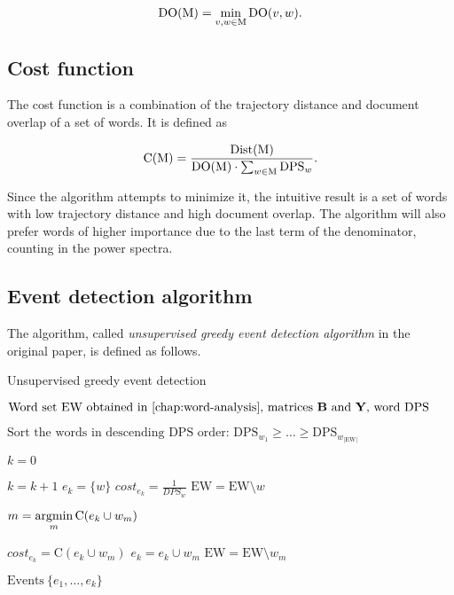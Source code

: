 \begin{equation} \label{eq:document-overlap}
	\text{DO}( \text{M} ) = \min_{v, w \in \text{M}} \text{DO}( v, w ).
\end{equation}

\subsection{Cost function}
The cost function is a combination of the trajectory distance and document overlap of a set of words. It is defined as

\begin{equation} \label{eq:cost-function-original}
	\text{C}( \text{M} ) = \frac{\text{Dist}( \text{M} )}{\text{DO}( \text{M} ) \cdot \sum_{w \in \text{M}} \text{DPS}_{w}}.
\end{equation}

Since the algorithm attempts to minimize it, the intuitive result is a set of words with low trajectory distance and high document overlap. The algorithm will also prefer words of higher importance due to the last term of the denominator, counting in the power spectra.

\newpage

\subsection{Event detection algorithm}
The algorithm, called \textit{unsupervised greedy event detection algorithm} in the original paper, is defined as follows.

\begin{algorithm}[H]
\begin{algorithmic}[1]
\caption{Unsupervised greedy event detection}
\label{alg:greedy-event-detection}
\Input $\text{Word set} ~ \text{EW obtained in \autoref{chap:word-analysis}, matrices } \bowmat \text{ and }\trajmat \text{, word DPS}$

\State $\text{Sort the words in descending DPS order: } \text{DPS}_{w_{1}} \geq \dots \geq \text{DPS}_{w_{\left\vert \text{EW} \right\vert}}$

\State $k = 0$

	\State $k = k + 1$	
	\State $e_{k} = \{ w \}$
	\State $cost_{e_{k}} = \frac{1}{DPS_{w}}$
	\State $\text{EW} = \text{EW} \setminus w$
	
		\State $m = \operatorname*{argmin}\limits_{m}{\text{C}( e_{k} \cup w_{m} )}$

			\State $cost_{e_{k}} = \text{C}( e_{k} \cup w_{m} )$
			\State $e_{k} = e_{k} \cup w_{m}$
			\State $\text{EW} = \text{EW} \setminus w_{m}$
		\Else
			\Break
		\EndIf
	\EndWhile
\EndFor

\Output $\text{Events} ~ \{ e_{1}, \dots, e_{k} \}$
\end{algorithmic}
\end{algorithm}

